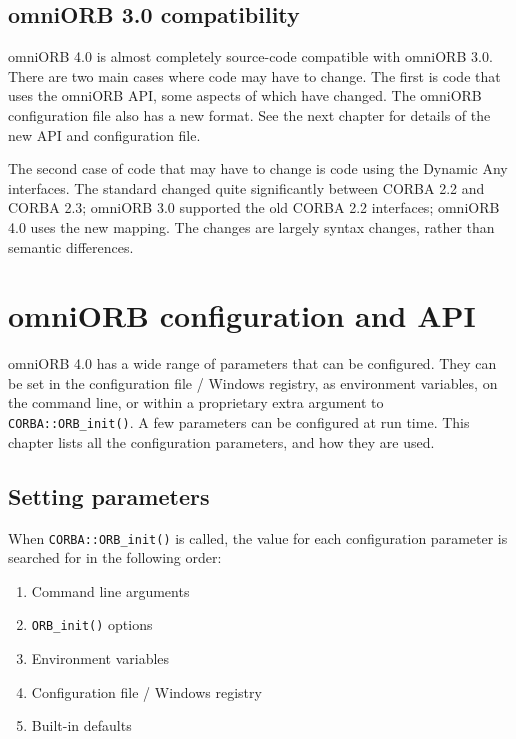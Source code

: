 \documentclass[11pt,twoside,a4paper]{book}
\newcommand{\op}[1]{\texttt{#1()}}
\begin{document}
\section{omniORB 3.0 compatibility}

omniORB 4.0 is almost completely source-code compatible with omniORB
3.0. There are two main cases where code may have to change. The first
is code that uses the omniORB API, some aspects of which have
changed. The omniORB configuration file also has a new format. See the
next chapter for details of the new API and configuration file.

The second case of code that may have to change is code using the
Dynamic Any interfaces. The standard changed quite significantly
between CORBA 2.2 and CORBA 2.3; omniORB 3.0 supported the old CORBA
2.2 interfaces; omniORB 4.0 uses the new mapping. The changes are
largely syntax changes, rather than semantic differences.




\chapter{omniORB configuration and API}
\label{chap:config}

omniORB 4.0 has a wide range of parameters that can be
configured. They can be set in the configuration file / Windows
registry, as environment variables, on the command line, or within a
proprietary extra argument to \op{CORBA::ORB\_init}. A few parameters
can be configured at run time. This chapter lists all the
configuration parameters, and how they are used.

\section{Setting parameters}

When \op{CORBA::ORB\_init} is called, the value for each configuration
parameter is searched for in the following order:

\begin{enumerate}

\item Command line arguments
\item \op{ORB\_init} options
\item Environment variables
\item Configuration file / Windows registry
\item Built-in defaults

\end{enumerate}
\end{document}
